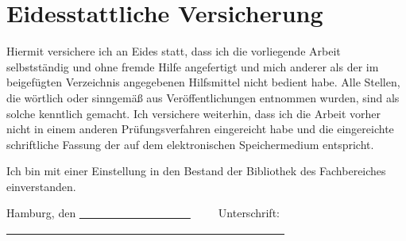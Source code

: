 \chapter*{Eidesstattliche Versicherung}
\thispagestyle{empty}

Hiermit versichere ich an Eides statt, dass ich die vorliegende Arbeit selbstständig und ohne fremde Hilfe angefertigt und mich anderer als der im beigefügten Verzeichnis angegebenen Hilfsmittel nicht bedient habe.
Alle Stellen, die wörtlich oder sinngemäß aus Veröffentlichungen entnommen wurden, sind als solche kenntlich gemacht. 
Ich versichere weiterhin, dass ich die Arbeit vorher nicht in einem anderen Prüfungsverfahren eingereicht habe und die eingereichte schriftliche Fassung der auf dem elektronischen Speichermedium entspricht.

\noindent Ich bin mit einer Einstellung in den Bestand der Bibliothek des Fachbereiches einverstanden.

\vspace{2cm} 

\noindent Hamburg, den \uline{~~~~~~~~~~~~~~~~~~~~}~~~~~Unterschrift: \uline{~~~~~~~~~~~~~~~~~~~~~~~~~~~~~~~~~~~~~~~~~~~~~~~~~~} 

